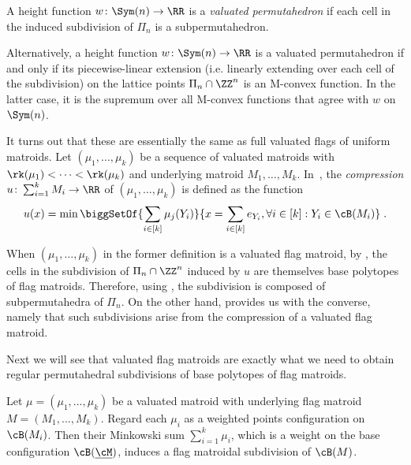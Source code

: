 
A height function $w \colon \Sym(n) \to \RR$ is a \emph{valuated permutahedron} if each cell in the induced subdivision of $\Pi_n$ is a subpermutahedron. 
\begin{remark}
	Alternatively, a height function $w \colon \Sym(n) \to \RR$ is a valuated permutahedron if and only if its piecewise-linear extension (i.e. linearly extending over each cell of the subdivision) on the lattice points $\Pi_n \cap \ZZ^{n}$ is an M-convex function.
	In the latter case, it is the supremum over all M-convex functions that agree with $w$ on $\Sym(n)$.   
\end{remark}
It turns out that these are essentially the same as full valuated flags of uniform matroids. 
Let $(\mu_1,\dots,\mu_k)$ be a sequence of valuated matroids with $\rk(\mu_1) < \dots < \rk(\mu_k)$ and underlying matroid $M_1,\dots,M_k$. 
In~\cite{FujishigeHirai:2022}, the \emph{compression} $u \colon \sum_{i=1}^{k}M_i \to\RR$ of $(\mu_1,\dots,\mu_k)$ is defined as the function
\begin{equation*}
	u(x)=\min\biggSetOf{\sum_{i\in[k]}\mu_j(Y_{i})}{x=\sum_{i\in[k]}e_{Y_{i}},\forall i \in [k]:Y_{i}\in \cB(M_i)} \;.
\end{equation*}

When $(\mu_1,\dots,\mu_k)$ in the former definition is a valuated flag matroid, by \cite[Theorem 4.4.2]{BrandtEurZhang:2021}, the cells in the subdivision of $\Pi_n \cap \ZZ^{n}$ induced by $u$ are themselves base polytopes of flag matroids. %
Therefore, using , the subdivision is composed of subpermutahedra of $\Pi_n$. 
On the other hand, \cite[Cor.~4.4.5]{BrandtEurZhang:2021} provides us with the converse, namely that such subdivisions arise from the compression of a valuated flag matroid. 

\iffalse


Next we will see that valuated flag matroids are exactly what we need to obtain regular permutahedral subdivisions of base polytopes of flag matroids.

\begin{theorem}\cite[Theorem 4.4.2]{BrandtEurZhang:2021}
	Let $\mu=(\mu_{1},...,\mu_{k})$ be a valuated matroid with underlying flag matroid $M=(M_{1},...,M_{k})$. Regard each $\mu_{i}$ as a weighted points configuration on $\cB(M_{i})$. Then their Minkowski sum $\sum^{k}_{i=1}\mu_{i}$, which is a weight on the base configuration $\cB(\underline{\cM})$, induces a flag matroidal subdivision of $\cB(M)$.
\end{theorem}

